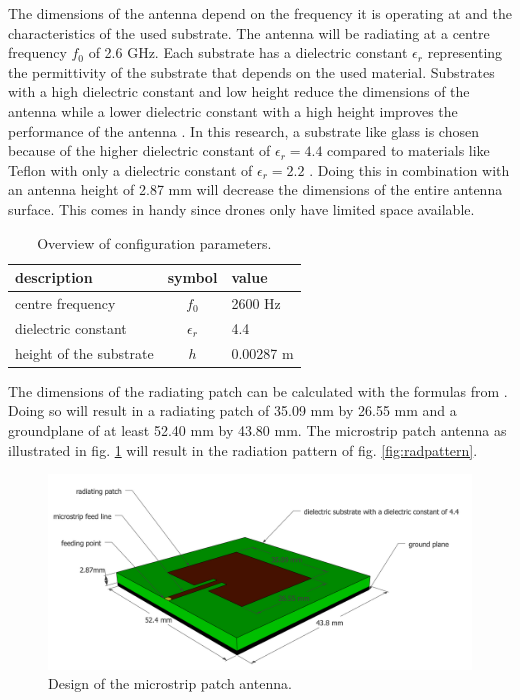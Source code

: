 \documentclass[twocolumn]{phdsymp} %
\begin{document}
The dimensions of the antenna depend on the frequency it is operating at and the characteristics of the used substrate.
The antenna will be radiating at a centre frequency $f_0$ of 2.6 GHz. Each substrate has a dielectric constant $\epsilon_r$ representing 
the permittivity of the substrate that depends on the used material.
Substrates with a high dielectric constant and low height 
reduce the dimensions of the antenna
while a lower dielectric constant with a high height improves the performance of the antenna \cite{J14_antennadesign,J15_antennadesign}. 
In this research, a substrate like glass 
is chosen because of the higher dielectric constant of $\epsilon_r = 4.4$ compared to materials like Teflon with only a dielectric 
constant of $\epsilon_r = 2.2$ \cite{J14_antennadesign}. 
Doing this in combination with an antenna height of 2.87 mm will decrease the dimensions of the entire antenna surface.
This comes in handy since drones only have limited space available.

\begin{table}[h!]
\centering
\begin{tabular}{|l|c|l|}
\hline
 description            & symbol          & value         \\    \hline
 centre frequency       & $f_0$           & 2600 Hz       \\ 
 dielectric constant    & $\epsilon_r$    & 4.4         \\ 
 height of the substrate & $h$             & 0.00287 m    \\ \hline
\end{tabular}
\caption{Overview of configuration parameters.}
\label{table:antennaparas}
\end{table}

The dimensions of the radiating patch can be calculated with the formulas from \cite{J14_antennadesign,J15_antennadesign}.
Doing so will result in a radiating patch of 35.09 mm by 26.55 mm and a groundplane of at least 52.40 mm by 43.80 mm.
The microstrip patch antenna as illustrated in fig. \ref{fig:basicpatchantenna} will result in the radiation pattern of fig. \ref{fig:radpattern}.
\begin{figure}[h!]
\centering
  \includegraphics[width=\linewidth]{MicrostripAntenna.png}
  \caption{Design of the microstrip patch antenna.}
  \label{fig:basicpatchantenna}
\end{figure}
\end{document}
